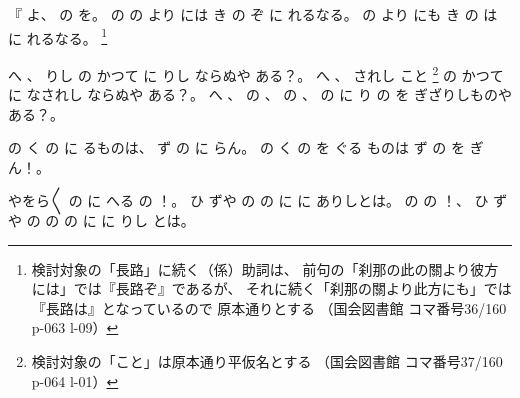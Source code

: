 %
『
よ、
%
の
を。
%
の
の
より
には
き
の
ぞ%
に
れるなる。
%
の
より
にも%
き
の
は
%
に
れるなる。
\footnote{%
検討対象の「長路」に続く（係）助詞は、
前句の「刹那の此の關より彼方には」では『長路ぞ』であるが、
それに続く「刹那の關より此方にも」では『長路は』となっているので
原本通りとする
（国会図書館 コマ番号36/160 p-063 l-09）}%

%
へ
、
%
りし
の
かつて
に%
りし
ならぬや
ある？。
%
へ
、
%
されし
こと
\footnote{%
検討対象の「こと」は原本通り平仮名とする
（国会図書館 コマ番号37/160 p-064 l-01）
}%
の
かつて
に%
なされし
ならぬや
ある？。
%
へ
、
%
の
、
%
の
、
%
の
に
り
の
を
ぎざりしものやある？。

%
の
く
の
に
るものは、
%
ず
の
に
らん。
%
の
く
の
を
ぐる
ものは
ず
の
を
ぎん！。

%
やをら〳〵
の
に
へる
の
！。
%
ひ
ずや
の
の
に
に
ありしとは。
%
の
の
！、
%
ひ
ずや
の
の
の
に
に
りし
とは。

